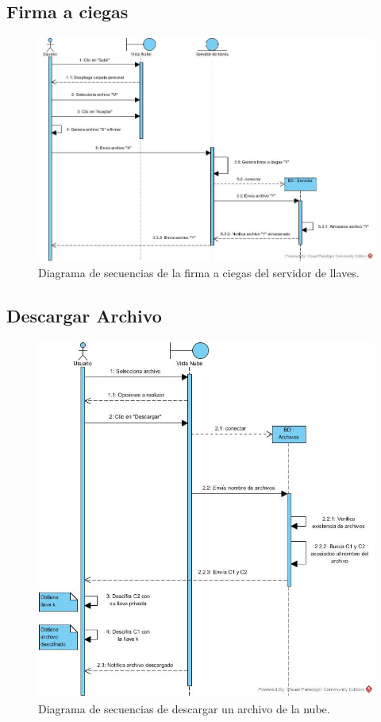 \subsection{Firma a ciegas}

\begin{figure}[htbp!]
		\centering
			\includegraphics[width=1\textwidth]{images/Firma_ciegas}
		\caption{Diagrama de secuencias de la firma a ciegas del servidor de llaves.}
\end{figure} 
\newpage

\subsection{Descargar Archivo}

\begin{figure}[htbp!]
		\centering
			\includegraphics[width=1\textwidth]{images/Descargar_Archivo}
		\caption{Diagrama de secuencias de descargar un archivo de la nube.}
\end{figure}

